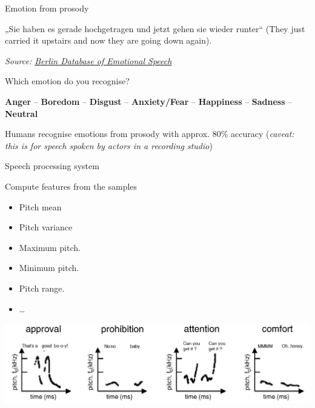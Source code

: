 \documentclass[compress]{beamer}
\newcommand{\source}[2]{{\tiny\it Source: \href{#1}{#2}}}
\begin{document}
\begin{frame}{Emotion from prosody}

„Sie haben es gerade hochgetragen und jetzt gehen sie wieder runter``
(They just carried it upstairs and now they are going down again).

    \begin{center}
    \hspace{0.3em}
    \hspace{0.3em}
    \hspace{0.3em}
    \hspace{0.3em}
    \end{center}

    \source{http://emodb.bilderbar.info/start.html}{Berlin Database of
  Emotional Speech}


Which emotion do you recognise?


    \textbf{Anger} -- \textbf{Boredom} -- \textbf{Disgust} -- \textbf{Anxiety/Fear} -- \textbf{Happiness} --
    \textbf{Sadness} --  \textbf{Neutral}

Humans recognise emotions from prosody with approx. 80\% accuracy
(\textit{caveat: this is for speech spoken by actors in a recording studio})

\end{frame}

\begin{frame}{Speech processing system}

Compute features from the samples

\begin{itemize}

\item
  Pitch mean
\item
  Pitch variance
\item
  Maximum pitch.
\item
  Minimum pitch.
\item
  Pitch range.
\item
  \ldots{}
\end{itemize}

    \begin{center}
        \includegraphics[width=0.8\linewidth]{prosody}
    \end{center}

\end{frame}
\end{document}
